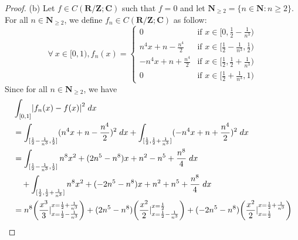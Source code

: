 \begin{proof}{(b)}
    Let \(f \in C(\mathbf{R} / \mathbf{Z} ; \mathbf{C})\) such that \(f = 0\) and let \(\mathbf{N}_{\geq 2} = \{n \in \mathbf{N} : n \geq 2\}\).
    For all \(n \in \mathbf{N}_{\geq 2}\), we define \(f_n \in C(\mathbf{R} / \mathbf{Z} ; \mathbf{C})\) as follow:
    \[
        \forall\ x \in [0, 1), f_n(x) = \begin{cases}
            0                          & \text{if } x \in [0, \frac{1}{2} - \frac{1}{n^3})           \\
            n^4 x + n - \frac{n^4}{2}  & \text{if } x \in [\frac{1}{2} - \frac{1}{n^3}, \frac{1}{2}) \\
            -n^4 x + n + \frac{n^4}{2} & \text{if } x \in [\frac{1}{2}, \frac{1}{2} + \frac{1}{n^3}) \\
            0                          & \text{if } x \in [\frac{1}{2} + \frac{1}{n^3}, 1)
        \end{cases}
    \]
    Since for all \(n \in \mathbf{N}_{\geq 2}\), we have
    \begin{align*}
         & \int_{[0, 1]} \abs*{f_n(x) - f(x)}^2 \; dx                                                                                                                                                                                                                                                        \\
         & = \int_{[\frac{1}{2} - \frac{1}{n^3}, \frac{1}{2}]} (n^4 x + n - \frac{n^4}{2})^2 \; dx + \int_{[\frac{1}{2}, \frac{1}{2} + \frac{1}{n^3}]} (-n^4 x + n + \frac{n^4}{2})^2 \; dx                                                                                                                  \\
         & = \int_{[\frac{1}{2} - \frac{1}{n^3}, \frac{1}{2}]} n^8 x^2 + (2n^5 - n^8) x + n^2 - n^5 + \frac{n^8}{4} \; dx                                                                                                                                                                                    \\
         & \quad + \int_{[\frac{1}{2}, \frac{1}{2} + \frac{1}{n^3}]} n^8 x^2 + (-2n^5 - n^8) x + n^2 + n^5 + \frac{n^8}{4} \; dx                                                                                                                                                                             \\
         & = n^8 \bigg(\frac{x^3}{3}|_{x = \frac{1}{2} - \frac{1}{n^3}}^{x = \frac{1}{2} + \frac{1}{n^3}}\bigg) + (2n^5 - n^8) \bigg(\frac{x^2}{2}|_{x = \frac{1}{2} - \frac{1}{n^3}}^{x = \frac{1}{2}}\bigg) + (-2n^5 - n^8) \bigg(\frac{x^2}{2}|_{x = \frac{1}{2}}^{x = \frac{1}{2} + \frac{1}{n^3}}\bigg) \\

\end{align*}
\end{proof}
